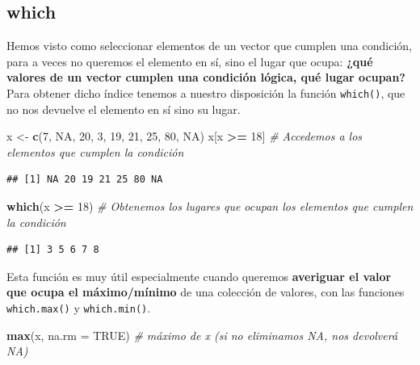 \documentclass[11pt,]{book}
\newenvironment{Shaded}{\begin{snugshade}}{\end{snugshade}}
\newcommand{\CommentTok}[1]{\textcolor[rgb]{0.37,0.37,0.37}{\textit{#1}}}
\newcommand{\DataTypeTok}[1]{\textcolor[rgb]{0.27,0.27,0.27}{#1}}
\newcommand{\DecValTok}[1]{\textcolor[rgb]{0.06,0.06,0.06}{#1}}
\newcommand{\KeywordTok}[1]{\textcolor[rgb]{0.27,0.27,0.27}{\textbf{#1}}}
\newcommand{\NormalTok}[1]{#1}
\newcommand{\OperatorTok}[1]{\textcolor[rgb]{0.43,0.43,0.43}{\textbf{#1}}}
\newcommand{\OtherTok}[1]{\textcolor[rgb]{0.37,0.37,0.37}{#1}}
\newcommand{\StringTok}[1]{\textcolor[rgb]{0.5,0.5,0.5}{#1}}
\begin{document}
\hypertarget{which}{%
\subsection{which}\label{which}}

Hemos visto como seleccionar elementos de un vector que cumplen una condición, para a veces no queremos el elemento en sí, sino el lugar que ocupa: \textbf{¿qué valores de un vector cumplen una condición lógica, qué lugar ocupan?} Para obtener dicho índice tenemos a nuestro disposición la función \texttt{which()}, que no nos devuelve el elemento en sí sino su lugar.

\begin{Shaded}
\begin{Highlighting}[]
\NormalTok{x <-}\StringTok{ }\KeywordTok{c}\NormalTok{(}\DecValTok{7}\NormalTok{, }\OtherTok{NA}\NormalTok{, }\DecValTok{20}\NormalTok{, }\DecValTok{3}\NormalTok{, }\DecValTok{19}\NormalTok{, }\DecValTok{21}\NormalTok{, }\DecValTok{25}\NormalTok{, }\DecValTok{80}\NormalTok{, }\OtherTok{NA}\NormalTok{)}
\NormalTok{x[x }\OperatorTok{>=}\StringTok{ }\DecValTok{18}\NormalTok{] }\CommentTok{# Accedemos a los elementos que cumplen la condición}
\end{Highlighting}
\end{Shaded}

\begin{verbatim}
## [1] NA 20 19 21 25 80 NA
\end{verbatim}

\begin{Shaded}
\begin{Highlighting}[]
\KeywordTok{which}\NormalTok{(x }\OperatorTok{>=}\StringTok{ }\DecValTok{18}\NormalTok{) }\CommentTok{# Obtenemos los lugares que ocupan los elementos que cumplen la condición}
\end{Highlighting}
\end{Shaded}

\begin{verbatim}
## [1] 3 5 6 7 8
\end{verbatim}

Esta función es muy útil especialmente cuando queremos \textbf{averiguar el valor que ocupa el máximo/mínimo} de una colección de valores, con las funciones \texttt{which.max()} y \texttt{which.min()}.

\begin{Shaded}
\begin{Highlighting}[]
\KeywordTok{max}\NormalTok{(x, }\DataTypeTok{na.rm =} \OtherTok{TRUE}\NormalTok{) }\CommentTok{# máximo de x (si no eliminamos NA, nos devolverá NA)}
\end{Highlighting}
\end{Shaded}
\end{document}

